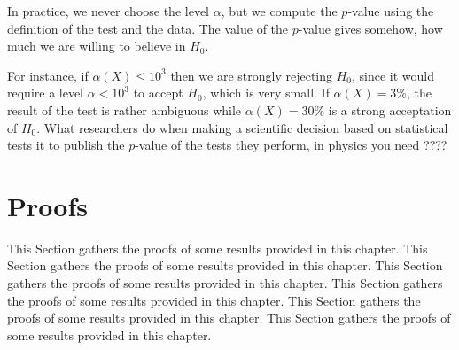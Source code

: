 \documentclass[
	fontsize=11pt, %
	twoside=false, %
	numbers=noenddot, %
]{kaobook}
\begin{document}
\begin{warning}
	In practice, we never choose the level $\alpha$, but we compute the $p$-value using the definition of the test and the data. The value of the $p$-value gives somehow, how much we are willing to believe in $H_0$.
\end{warning}



For instance, if $\alpha(X) \leq 10^3$ then we are strongly rejecting $H_0$, since it would require a level $\alpha < 10^3$ to accept $H_0$, which is very small. 
If $\alpha(X) = 3\%$, the result of the test is rather ambiguous while $\alpha(X) = 30\%$ is a strong acceptation of $H_0$.
What researchers  do when making a scientific decision based on statistical tests it to publish the $p$-value of the tests they perform, in physics you need ???? 



\section{Proofs} %
\label{sec:chap03-proofs}

This Section gathers the proofs of some results provided in this chapter.
This Section gathers the proofs of some results provided in this chapter.
This Section gathers the proofs of some results provided in this chapter.
This Section gathers the proofs of some results provided in this chapter.
This Section gathers the proofs of some results provided in this chapter.
This Section gathers the proofs of some results provided in this chapter.






\end{document}

